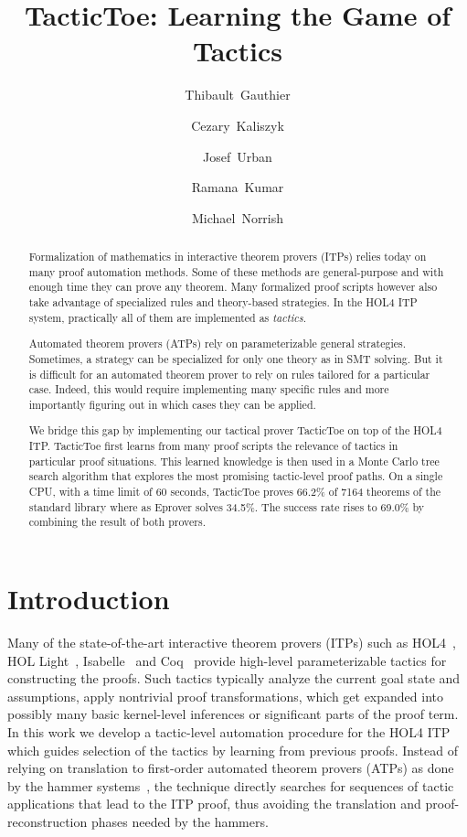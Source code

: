 \documentclass[runningheads,a4paper,draft]{svjour3}
\title{TacticToe: Learning the Game of Tactics}
\author{\mbox{Thibault Gauthier} \and \mbox{Cezary Kaliszyk} \and \mbox{Josef 
Urban} \and \mbox{Ramana Kumar} \and \mbox{Michael Norrish}}
\institute{Thibault Gauthier and Cezary Kaliszyk \at
Department of Computer Science, University of Innsbruck,
Innsbruck, Austria\\ \url{{thibault.gauthier,cezary.kaliszyk}@uibk.ac.at}
\and
Josef Urban \at Czech Technical University, Prague\\\url{josef.urban@gmail.com}
\and Ramana Kumar and Michael Norrish \at Data61}
\newcommand{\todoi}[1]{\todo[inline]{#1}}
\def\holfour{\textsf{HOL4}\xspace}
\def\isabelle{\textsf{Isabelle}\xspace}
\def\hollight{\textsf{HOL Light}\xspace}
\def\coq{\textsf{Coq}\xspace}
\begin{document}
\maketitle

\begin{abstract}
Formalization of mathematics in interactive theorem provers (ITPs) 
relies today on many proof automation methods.
Some of these methods are general-purpose and with enough time they can prove any 
theorem. Many formalized proof scripts however also
take advantage of specialized rules and theory-based strategies. 
In the HOL4 ITP system, practically all of them are implemented as \emph{tactics}. 

Automated theorem provers (ATPs) rely on parameterizable general 
strategies. Sometimes, a strategy can be specialized for only one theory as in 
SMT solving. But it is difficult for an automated theorem prover to rely on 
rules tailored for a particular case. 
Indeed, this would require implementing many specific rules and more 
importantly figuring out in which cases they can be applied. 

We bridge this gap by implementing our tactical prover TacticToe on top 
of the HOL4 ITP. 
TacticToe first learns from many proof scripts
the relevance of tactics in particular proof situations.
This learned knowledge is then used in a Monte Carlo tree search algorithm that explores the most promising tactic-level proof paths. 
On a single CPU, with a time limit of 60 seconds, TacticToe proves 66.2\% 
of 7164 theorems of the standard library where as 
Eprover solves 34.5\%. The success rate rises to 69.0\% by combining the 
result of both provers.
\end{abstract}

\section{Introduction}
\tableofcontents

\todoi{Comparison with hammers in usability}
Many of the state-of-the-art interactive theorem provers (ITPs) such as
  \holfour~\cite{hol4}, \hollight~\cite{Harrison09hollight}, 
  \isabelle~\cite{isabelle} 
  and \coq~\cite{coq-book}
  provide high-level parameterizable tactics for constructing the
  proofs.  Such tactics typically analyze the current goal state and
  assumptions, apply nontrivial proof transformations, which get
  expanded into possibly many basic kernel-level inferences or significant 
  parts of the proof term.
  In this
  work we develop a tactic-level automation procedure for the \holfour ITP
  which guides selection of the tactics by learning from previous
  proofs.  Instead of relying on translation to first-order automated
  theorem provers (ATPs) as done by the hammer 
  systems~\cite{hammers4qed,tgck-cpp15}, the technique
  directly searches for sequences of tactic applications that lead to
  the ITP proof, thus avoiding the translation and
  proof-reconstruction phases needed by the hammers.
\end{document}
